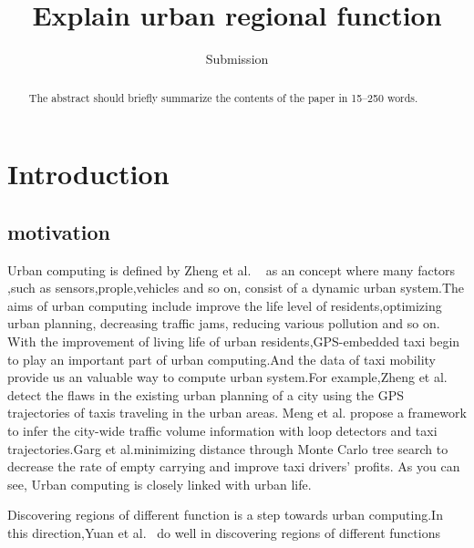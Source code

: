 \documentclass[runningheads]{llncs}
\begin{document}
\title{Explain urban regional function}
\author{Submission}

\maketitle 

\begin{abstract}
The abstract should briefly summarize the contents of the paper in
15--250 words.

\end{abstract}
%


\section{Introduction}

\subsection{motivation}
Urban computing is defined by Zheng et al. ~\cite{Zheng2014UrbanConcepts} as an concept where many factors ,such as sensors,prople,vehicles and so on, consist of a dynamic urban system.The aims of urban computing include improve the life level of residents,optimizing urban planning, decreasing traffic jams, reducing various pollution and so on.
With the improvement of living life of urban residents,GPS-embedded taxi begin to play an important part of urban computing.And the data of taxi mobility provide us an valuable way to compute urban system.For example,Zheng et al. ~\cite{Zheng2011taxicabs} detect the flaws in the existing urban planning of a city using the GPS trajectories of taxis traveling in the urban areas. Meng et al.\cite{Meng2017Traffic} propose a framework to infer the city-wide traffic volume information with loop detectors and taxi trajectories.Garg et al.\cite{Garg2018Route}minimizing distance through Monte Carlo tree search to decrease the rate of empty carrying and improve taxi drivers’ profits.
As you can see, Urban computing is closely linked with urban life.

Discovering regions of different function is a step towards urban computing.In this direction,Yuan et al.~\cite{Yuan2012FunctionRegion,Yuan2015FunctionRegion,Yuan2018FunctionRegion} do well in discovering regions of different functions %
\end{document}
